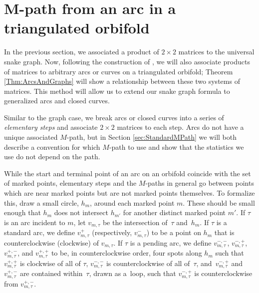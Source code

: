 \section[$M$-path from an arc in a triangulated orbifold]{$\boldsymbol{M}$-path from an arc in a triangulated orbifold} \label{sec:$M$-path}

In the previous section, we associated a product of $2 \times 2$ matrices to the universal snake graph. Now, following the construction of \cite{MW}, we will also associate products of matrices to arbitrary arcs or curves on a triangulated orbifold; Theorem \ref{Thm:ArcsAndGraphs} will show a relationship between these two systems of matrices. This method will allow us to extend our snake graph formula to generalized arcs and closed curves.

Similar to the graph case, we break arcs or closed curves into a series of \emph{elementary steps} and associate $2 \times 2$ matrices to each step. Arcs do not have a unique associated $M$-path, but in Section \ref{sec:StandardMPath} we will both describe a convention for which $M$-path to use and show that the statistics we use do not depend on the path.

While the start and terminal point of an arc on an orbifold coincide with the set of marked points, elementary steps and the $M$-paths in general go between points which are near marked points but are not marked points themselves. To formalize this, draw a small circle, $h_m$, around each marked point $m$. These should be small enough that $h_m$ does not intersect $h_{m'}$ for another distinct marked point $m'$. If $\tau$ is an arc incident to $m$, let $v_{m,\tau}$ be the intersection of~$\tau$ and~$h_m$. If $\tau$ is a standard arc, we define $v^+_{m,\tau}$ (respectively, $v^-_{m,\tau}$) to be a point on $h_m$ that is counterclockwise (clockwise) of $v_{m,\tau}$. If $\tau$ is a pending arc, we define $v^{-,-}_{m,\tau}$, $v^{-,+}_{m,\tau}$, $v^{+,-}_{m,\tau}$, and $v^{+,+}_{m,\tau}$ to be, in counterclockwise order, four spots along $h_m$ such that $v^{+,+}_{m,\tau}$ is clockwise of all of $\tau$, $v^{-,-}_{m,\tau}$ is counterclockwise of all of~$\tau$, and~$v^{-,+}_{m,\tau}$ and~$v^{+,-}_{m,\tau}$ are contained within~$\tau$, drawn as a~loop, such that $v^{-,+}_{m,\tau}$ is counterclockwise from $v^{+,-}_{m,\tau}$.

